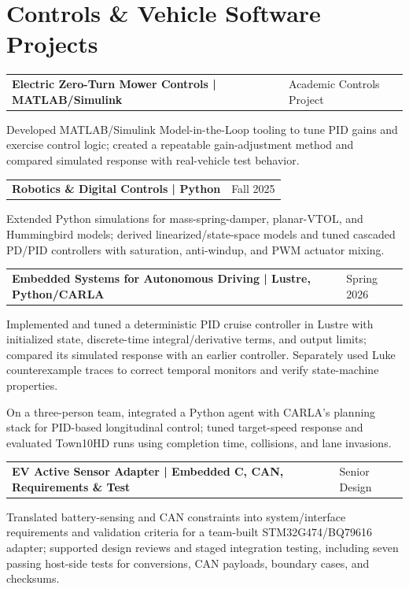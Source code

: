 \documentclass[10pt,letterpaper]{article}
\makeatletter
\newcommand{\resumeentry}[2]{%
  \begin{tabularx}{\textwidth}{@{}X>{\raggedleft\arraybackslash}p{2.40in}@{}}
    \textbf{#1} & #2
  \end{tabularx}\vspace{-0.075cm}
}
\makeatother
\begin{document}
\section{Controls \& Vehicle Software Projects}
\resumeentry{Electric Zero-Turn Mower Controls | MATLAB/Simulink}{Academic Controls Project}
\begin{resumebullets}
  \item Developed MATLAB/Simulink Model-in-the-Loop tooling to tune PID gains and exercise control logic; created a repeatable gain-adjustment method and compared simulated response with real-vehicle test behavior.
\end{resumebullets}

\resumeentry{Robotics \& Digital Controls | Python}{Fall 2025}
\begin{resumebullets}
  \item Extended Python simulations for mass-spring-damper, planar-VTOL, and Hummingbird models; derived linearized/state-space models and tuned cascaded PD/PID controllers with saturation, anti-windup, and PWM actuator mixing.
\end{resumebullets}

\resumeentry{Embedded Systems for Autonomous Driving | Lustre, Python/CARLA}{Spring 2026}
\begin{resumebullets}
  \item Implemented and tuned a deterministic PID cruise controller in Lustre with initialized state, discrete-time integral/derivative terms, and output limits; compared its simulated response with an earlier controller. Separately used Luke counterexample traces to correct temporal monitors and verify state-machine properties.
  \item On a three-person team, integrated a Python agent with CARLA's planning stack for PID-based longitudinal control; tuned target-speed response and evaluated Town10HD runs using completion time, collisions, and lane invasions.
\end{resumebullets}

\resumeentry{EV Active Sensor Adapter | Embedded C, CAN, Requirements \& Test}{Senior Design}
\begin{resumebullets}
  \item Translated battery-sensing and CAN constraints into system/interface requirements and validation criteria for a team-built STM32G474/BQ79616 adapter; supported design reviews and staged integration testing, including seven passing host-side tests for conversions, CAN payloads, boundary cases, and checksums.
\end{resumebullets}
\end{document}
